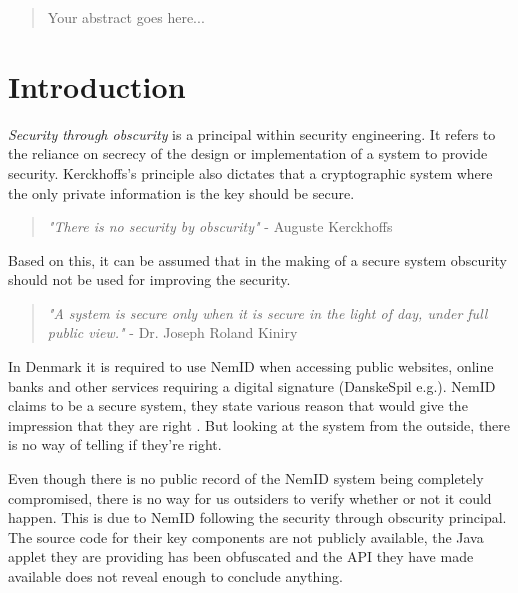 \documentclass[twosided]{report}
\begin{document}
\begin{abstract}
Your abstract goes here...
\end{abstract}


\begingroup
    \let\clearpage\relax
	\tableofcontents
    \listoffigures
	\lstlistoflistings
\endgroup

\chapter{Introduction}
\emph{Security through obscurity} is a principal within security engineering. It refers to the reliance on secrecy of the design or implementation of a system to provide security. Kerckhoffs's principle also dictates that a cryptographic system where the only private information is the key should be secure.
\begin{quote}
\textit{"There is no security by obscurity"} - Auguste Kerckhoffs \cite{kerckhoffs}
\end{quote}

Based on this, it can be assumed that in the making of a secure system obscurity should not be used for improving the security.
\begin{quote}
\textit{"A system is secure only when it is secure in the light of day, under full public view."} - Dr. Joseph Roland Kiniry \cite{ftspeech}
\end{quote}
\par
In Denmark it is required to use NemID when accessing public websites, online banks and other services requiring a digital signature (DanskeSpil e.g.). NemID claims to be a secure system, they state various reason that would give the impression that they are right \cite{omnemsikkerhed}. But looking at the system from the outside, there is no way of telling if they're right.
\par
Even though there is no public record of the NemID system being completely compromised, there is no way for us outsiders to verify whether or not it could happen. This is due to NemID following the security through obscurity principal. The source code for their key components are not publicly available, the Java applet they are providing has been obfuscated and the API they have made available does not reveal enough to conclude anything.
\end{document}
